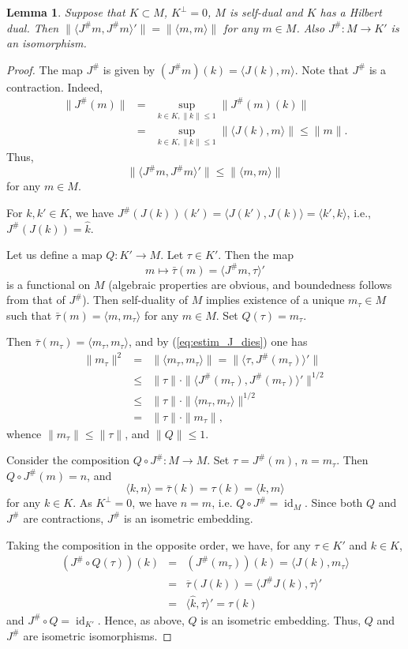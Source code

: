 \documentclass[12pt]{amsart}
\newtheorem{lem}[teo]{Lemma}
\def\<{\langle}
\def\>{\rangle}
\begin{document}
\begin{lem}\label{lem:inner}	
Suppose that $K\subset M$, $K^\perp=0$, $M$ is self-dual and $K$ has a Hilbert dual. Then $\|\langle J^\#m,J^\#m\rangle'\|=\|\langle m,m\rangle\|$ for any $m\in M$.  Also $J^\#:M\to K'$ is an isomorphism.
\end{lem}
\begin{proof}
The map $J^\#$ is given by $(J^\#m)(k)=\langle J(k),m\rangle$. Note that $J^\#$ is a contraction. Indeed, 
\begin{eqnarray*}
\|J^\#(m)\|&=&\sup_{k\in K,\|k\|\leq 1}\|J^\#(m)(k)\|\\
&=&\sup_{k\in K,\|k\|\leq 1}\|\langle J(k),m\rangle\|\leq\|m\|. 
\end{eqnarray*}
Thus, 
\begin{equation}\label{eq:estim_J_dies}
\| \langle J^\#m,J^\#m\rangle' \| \leq \| \langle m,m\rangle \|
\end{equation}
for any $m\in M$.

For $k,k'\in K$, we have
$J^\#(J(k))(k')=\<J(k'),J(k)\>=\<k',k\>$, i.e., $J^\#(J(k))=\widehat{k}$.

Let us define a map $Q:K'\to M$. Let $\tau\in K'$. Then the map 
$$
m\mapsto\bar\tau(m)=\langle J^\#m, \tau \rangle'
$$ 
is a functional on $M$ (algebraic properties are obvious, and boundedness follows from that of $J^\#$). Then self-duality of $M$ implies existence of a unique $m_\tau\in M$ such that  $\bar\tau(m)=\langle m,m_\tau\rangle$  for any $m\in M$. Set $Q(\tau)=m_\tau$. 

Then $\bar\tau(m_\tau)=\langle m_\tau,m_\tau\rangle$, 
and by (\ref{eq:estim_J_dies}) one has
\begin{eqnarray*}
\|m_\tau\|^2&=&\|\langle m_\tau,m_\tau\rangle\|=\|\langle\tau,J^\#(m_\tau)\rangle'\|\\
&\leq&\|\tau\| \cdot \|\langle J^\#(m_\tau),J^\#(m_\tau)\rangle'\|^{1/2}\\
&\leq& \|\tau\|\cdot \|\langle m_\tau,m_\tau\rangle\|^{1/2}\\
&=&\|\tau\|\cdot \|m_\tau\|,
\end{eqnarray*}
whence $\|m_\tau\|\leq\|\tau\|$, and $\|Q\|\leq 1$.

Consider the composition $Q\circ J^\#:M\to M$. Set $\tau=J^\#(m)$, $n=m_\tau$. Then $Q\circ J^\#(m)=n$, and
$$
\langle k,n\rangle=\bar\tau(k)=\tau(k)=\langle k,m\rangle
$$
for any $k\in K$. As $K^\perp=0$, we have $n=m$, i.e. $Q\circ J^\#=\operatorname{id}_M$. Since both $Q$ and $J^\#$ are contractions, $J^\#$ is an isometric embedding.

Taking the composition in the opposite order, we have, for any $\tau\in K'$ and $k \in K$,
\begin{eqnarray*}
(J^\#\circ Q (\tau) )(k) &=& (J^\#(m_\tau) )(k) = \<J(k),m_\tau\>\\
&=&\overline{\tau}(J(k))=\<J^\# J(k),\tau\>'\\
&=& \<\widehat{k},\tau\>'=
\tau(k) 
\end{eqnarray*}
and $J^\#\circ Q=\operatorname{id}_{K'}$. Hence, as above, $Q$  is an isometric embedding. Thus, $Q$ and $J^\#$ are isometric isomorphisms.
\end{proof}
\end{document}
